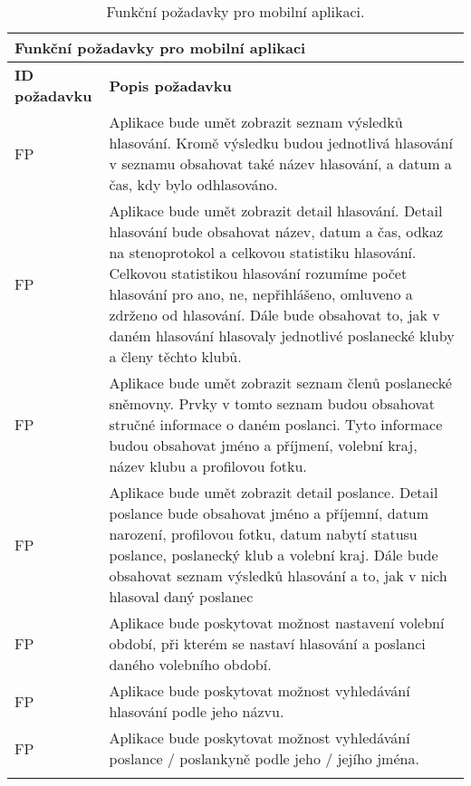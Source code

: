 \def\arraystretch{1.5}
\begin{longtable}{|l|p{9cm}|} \hline
	\multicolumn{2}{|l|}{\textbf{Funkční požadavky pro mobilní aplikaci}} \\ \hline
	
	\textbf{ID požadavku} & \textbf{Popis požadavku} \\ \hline
	
	FP\textunderscore01	& Aplikace bude umět zobrazit seznam výsledků hlasování. Kromě výsledku budou jednotlivá hlasování v seznamu obsahovat také název hlasování, a datum a čas, kdy bylo odhlasováno. \\ \hline
	
	FP\textunderscore02	& Aplikace bude umět zobrazit detail hlasování. Detail hlasování bude obsahovat název, datum a čas, odkaz na stenoprotokol a celkovou statistiku hlasování. Celkovou statistikou hlasování rozumíme počet hlasování pro ano, ne, nepřihlášeno, omluveno a zdrženo od hlasování. Dále bude obsahovat to, jak v daném hlasování hlasovaly jednotlivé poslanecké kluby a členy těchto klubů. \\ \hline
	
	FP\textunderscore03	& Aplikace bude umět zobrazit seznam členů poslanecké sněmovny. Prvky v tomto seznam budou obsahovat stručné informace o daném poslanci. Tyto informace budou obsahovat jméno a příjmení, volební kraj, název klubu a profilovou fotku. \\ \hline
	
	FP\textunderscore04	& Aplikace bude umět zobrazit detail poslance. Detail poslance bude obsahovat jméno a příjemní, datum narození, profilovou fotku, datum nabytí statusu poslance, poslanecký klub a volební kraj. Dále bude obsahovat seznam výsledků hlasování a to, jak v nich hlasoval daný poslanec\\ \hline
	
	FP\textunderscore05	& Aplikace bude poskytovat možnost nastavení volební období, při kterém se nastaví hlasování a poslanci daného volebního období.\\ \hline
	
	FP\textunderscore06	& Aplikace bude poskytovat možnost vyhledávání hlasování podle jeho názvu.\\ \hline
	
	FP\textunderscore07	& Aplikace bude poskytovat možnost vyhledávání poslance / poslankyně podle jeho / jejího jména.\\ \hline
	
	\caption{Funkční požadavky pro mobilní aplikaci.}
	\label{table:func_req_app}
\end{longtable}

